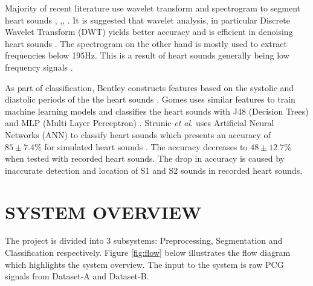 \documentclass[10pt,twocolumn]{witseiepaper}
\begin{document}
Majority of recent literature use wavelet transform and spectrogram to segment heart sounds  \cite{meziani2012analysis}, \cite{debbal2008filtering},\cite{liang1997heart}, \cite{deng2012robust}. It is suggested that wavelet analysis, in particular Discrete Wavelet Transform (DWT) yields better accuracy and is efficient in denoising heart sounds \cite{strunic2007detection}. The spectrogram on the other hand is mostly used to extract frequencies below 195Hz. This is a result of heart sounds generally being low frequency signals \cite{deng2012robust}.

As part of classification, Bentley constructs features based on the systolic and diastolic periods of the the heart sounds \cite{deng2012robust}. Gomes uses similar features to train  machine learning models and classifies the heart sounds with J48 (Decision Trees) and MLP (Multi Layer Perceptron) \cite{gomes2012classifying}. Strunic \textit{et al.} uses Artificial Neural Networks (ANN) to classify heart sounds which presents an accuracy of $85\pm7.4\%$ for simulated heart sounds \cite{strunic2007detection}. The accuracy decreases to $48\pm12.7\%$ when tested with recorded heart sounds. The drop in accuracy is caused by inaccurate detection and location of S1 and S2 sounds in recorded heart sounds.

\section{SYSTEM OVERVIEW}

The project is divided into 3 subsystems: Preprocessing, Segmentation and Classification respectively. Figure \ref{fig:flow} below illustrates the flow diagram which highlights the system overview. The input to the system is raw PCG signals from Dataset-A and Dataset-B.
\end{document}
